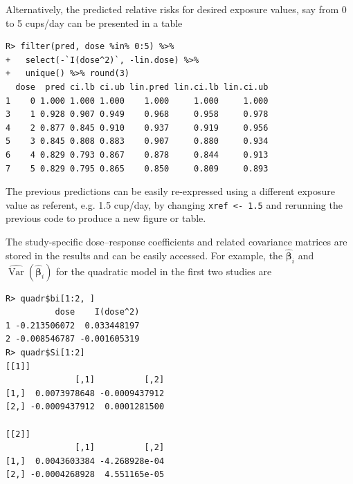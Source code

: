\documentclass[11pt,a4paper,twoside,openany]{book}\usepackage{knitr}
\DeclareMathOperator{\Var}{Var}
\begin{document}
{\begin{knitrout}
\end{knitrout}

\noindent Alternatively, the predicted relative risks for desired exposure values, say from 0 to 5 cups/day can be presented in a table

\begin{knitrout}\footnotesize
{}\color{fgcolor}\begin{kframe}
\begin{verbatim}
R> filter(pred, dose %in% 0:5) %>%
+   select(-`I(dose^2)`, -lin.dose) %>% 
+   unique() %>% round(3)
  dose  pred ci.lb ci.ub lin.pred lin.ci.lb lin.ci.ub
1    0 1.000 1.000 1.000    1.000     1.000     1.000
3    1 0.928 0.907 0.949    0.968     0.958     0.978
4    2 0.877 0.845 0.910    0.937     0.919     0.956
5    3 0.845 0.808 0.883    0.907     0.880     0.934
6    4 0.829 0.793 0.867    0.878     0.844     0.913
7    5 0.829 0.795 0.865    0.850     0.809     0.893
\end{verbatim}
\end{kframe}
\end{knitrout}

\noindent The previous predictions can be easily re-expressed using a different exposure value as referent, e.g. 1.5 cup/day, by changing \texttt{xref <- 1.5} and rerunning the previous code to produce a new figure or table.

The study-specific dose--response coefficients and related covariance matrices are stored in the results and can be easily accessed. For example, the $\boldsymbol{\hat \beta}_i$ and $\widehat{\Var} \left( \boldsymbol{\hat \beta}_i \right)$ for the quadratic model in the first two studies are

\begin{knitrout}\footnotesize
{}\color{fgcolor}\begin{kframe}
\begin{verbatim}
R> quadr$bi[1:2, ]
          dose    I(dose^2)
1 -0.213506072  0.033448197
2 -0.008546787 -0.001605319
R> quadr$Si[1:2]
[[1]]
              [,1]          [,2]
[1,]  0.0073978648 -0.0009437912
[2,] -0.0009437912  0.0001281500

[[2]]
              [,1]          [,2]
[1,]  0.0043603384 -4.268928e-04
[2,] -0.0004268928  4.551165e-05
\end{verbatim}
\end{kframe}
\end{knitrout}

}
\end{document}
